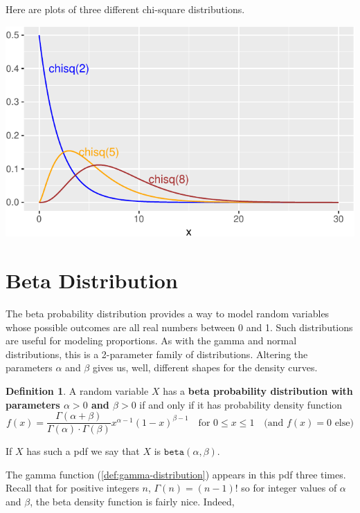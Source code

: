 \documentclass[
]{book}
\theoremstyle{definition}
\newtheorem{definition}{Definition}[chapter]
\theoremstyle{definition}
\theoremstyle{definition}
\theoremstyle{definition}
\theoremstyle{remark}
\begin{document}
Here are plots of three different chi-square distributions.

\begin{center}\includegraphics{math340-notes_files/figure-latex/unnamed-chunk-22-1} \end{center}

\section{Beta Distribution}\label{beta-distribution}

The beta probability distribution provides a way to model random variables whose possible outcomes are all real numbers between 0 and 1. Such distributions are useful for modeling proportions. As with the gamma and normal distributions, this is a 2-parameter family of distributions. Altering the parameters \(\alpha\) and \(\beta\) gives us, well, different shapes for the density curves.

\begin{definition}
\protect\hypertarget{def:beta-distribution}{}\label{def:beta-distribution}A random variable \(X\) has a \textbf{beta probability distribution with parameters \(\alpha>0\) and \(\beta>0\)} if and only if it has probability density function
\[
f(x)=
\frac{\Gamma(\alpha + \beta)}{\Gamma(\alpha)\cdot \Gamma(\beta)}x^{\alpha-1}(1-x)^{\beta-1}~~~ \text{ for }0 \leq x \leq 1~~~ \text{ (and }f(x) = 0\text{ else)}
\]

If \(X\) has such a pdf we say that \(X\) is \(\texttt{beta}(\alpha,\beta)\).
\end{definition}

The gamma function (\ref{def:gamma-distribution}) appears in this pdf three times. Recall that for positive integers \(n\), \(\Gamma(n) = (n-1)!\) so for integer values of \(\alpha\) and \(\beta\), the beta density function is fairly nice.
Indeed,
\end{document}
